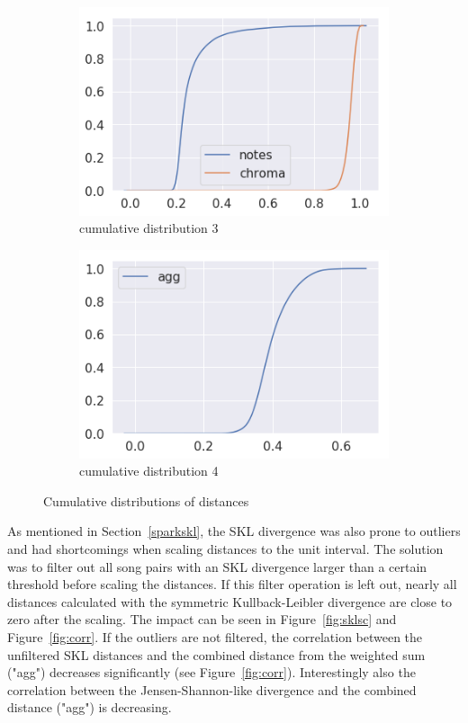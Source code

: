 \begin{figure}[htbp]
{{			\begin{subfigure}{.495\textwidth}
				\centering     
				\includegraphics[scale=0.5]{Images/SparkFeat/cum3.png}
				\caption{cumulative distribution 3}
				\label{cum3}
			\end{subfigure}%
			\begin{subfigure}{.495\textwidth}
				\centering    
				\includegraphics[scale=0.5]{Images/SparkFeat/cum4.png}
				\caption{cumulative distribution 4}
				\label{cum4}
			\end{subfigure}	
	}}
	\caption{Cumulative distributions of distances}
	\label{fig:cumdist}
\end{figure}

\noindent As mentioned in Section~\ref{sparkskl}, the SKL divergence was also prone to outliers and had shortcomings when scaling distances to the unit interval. The solution was to filter out all song pairs with an SKL divergence larger than a certain threshold before scaling the distances. If this filter operation is left out, nearly all distances calculated with the symmetric Kullback-Leibler divergence are close to zero after the scaling. The impact can be seen in Figure~\ref{fig:sklsc} and Figure~\ref{fig:corr}.
\noindent If the outliers are not filtered, the correlation between the unfiltered SKL distances and the combined distance from the weighted sum ("agg") decreases significantly (see Figure~\ref{fig:corr}). Interestingly also the correlation between the Jensen-Shannon-like divergence and the combined distance ("agg") is decreasing. 

